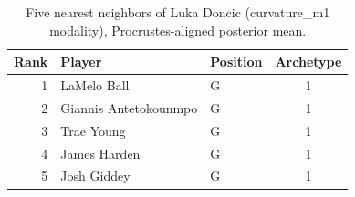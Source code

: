 \begin{table}[htbp]
  \centering\small
  \begin{tabular}{rllc}
    \toprule
    Rank & Player & Position & Archetype \\
    \midrule
    1 & LaMelo Ball & G & 1 \\
    2 & Giannis Antetokounmpo & G & 1 \\
    3 & Trae Young & G & 1 \\
    4 & James Harden & G & 1 \\
    5 & Josh Giddey & G & 1 \\
    \bottomrule
  \end{tabular}
  \caption{Five nearest neighbors of Luka Doncic (curvature_m1 modality), Procrustes-aligned posterior mean.}
  \label{tab:Luka_Doncic_neighbors_curvature_m1}
\end{table}

